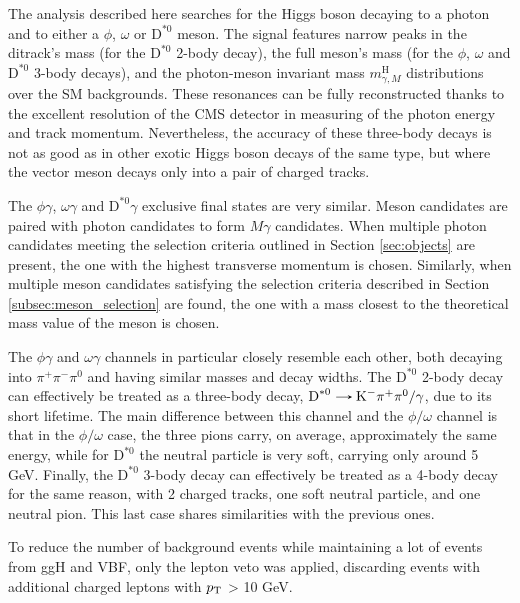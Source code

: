 The analysis described here searches for the Higgs boson decaying to a photon and to either a $\phi$, $\omega$ or $\text{D}^{*0}$ meson. The signal features narrow peaks in the ditrack's mass (for the $\text{D}^{*0}$ 2-body decay), the full meson's mass (for the $\phi$, $\omega$ and $\text{D}^{*0}$ 3-body decays), and the photon-meson invariant mass $m^{\text{H}}_{\gamma, M}$ distributions over the SM backgrounds. These resonances can be fully reconstructed thanks to the excellent resolution of the CMS detector in measuring of the photon energy and track momentum. Nevertheless, the accuracy of these three-body decays is not as good as in other exotic Higgs boson decays of the same type, but where the vector meson decays only into a pair of charged tracks.

The $\phi\gamma$, $\omega\gamma$ and $\text{D}^{*0}\gamma$ exclusive final states are very similar. Meson candidates are paired with photon candidates to form $M\gamma$ candidates. When multiple photon candidates meeting the selection criteria outlined in Section \ref{sec:objects} are present, the one with the highest transverse momentum is chosen. Similarly, when multiple meson candidates satisfying the selection criteria described in Section \ref{subsec:meson_selection} are found, the one with a mass closest to the theoretical mass value of the meson is chosen.

The $\phi\gamma$ and $\omega\gamma$ channels in particular closely resemble each other, both decaying into $\pi^{+}\pi^{-}\pi^0$ and having similar masses and decay widths. The $\text{D}^{*0}$ 2-body decay can effectively be treated as a three-body decay, $\text{D}^{*0}\decaysto \text{K}^{-}\pi^{+}\pi^0/\gamma$, due to its short lifetime. The main difference between this channel and the $\phi/\omega$ channel is that in the $\phi/\omega$ case, the three pions carry, on average, approximately the same energy, while for $\text{D}^{*0}$ the neutral particle is very soft, carrying only around 5 GeV. Finally, the $\text{D}^{*0}$ 3-body decay can effectively be treated as a 4-body decay for the same reason, with 2 charged tracks, one soft neutral particle, and one neutral pion. This last case shares similarities with the previous ones.

To reduce the number of background events while maintaining a lot of events from ggH and VBF, only the lepton veto was applied, discarding events with additional charged leptons with $p_\text{T}$ > 10 GeV.%

